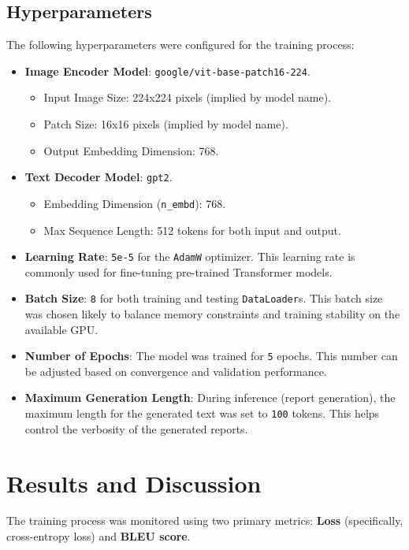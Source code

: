 \documentclass[a4paper, 12pt]{article}
\begin{document}
\begin{itemize}
\subsection{Hyperparameters}
The following hyperparameters were configured for the training process:
\begin{itemize}
    \item \textbf{Image Encoder Model}: \texttt{google/vit-base-patch16-224}.
        \begin{itemize}
            \item Input Image Size: 224x224 pixels (implied by model name).
            \item Patch Size: 16x16 pixels (implied by model name).
            \item Output Embedding Dimension: 768.
        \end{itemize}
    \item \textbf{Text Decoder Model}: \texttt{gpt2}.
        \begin{itemize}
            \item Embedding Dimension (\texttt{n\_embd}): 768.
            \item Max Sequence Length: 512 tokens for both input and output.
        \end{itemize}
    \item \textbf{Learning Rate}: \texttt{5e-5} for the \texttt{AdamW} optimizer. This learning rate is commonly used for fine-tuning pre-trained Transformer models.
    \item \textbf{Batch Size}: \texttt{8} for both training and testing \texttt{DataLoader}s. This batch size was chosen likely to balance memory constraints and training stability on the available GPU.
    \item \textbf{Number of Epochs}: The model was trained for \texttt{5} epochs. This number can be adjusted based on convergence and validation performance.
    \item \textbf{Maximum Generation Length}: During inference (report generation), the maximum length for the generated text was set to \texttt{100} tokens. This helps control the verbosity of the generated reports.
\end{itemize}

\section{Results and Discussion}
\label{sec:results}

The training process was monitored using two primary metrics: \textbf{Loss} (specifically, cross-entropy loss) and \textbf{BLEU score}.


\end{itemize}
\end{document}
